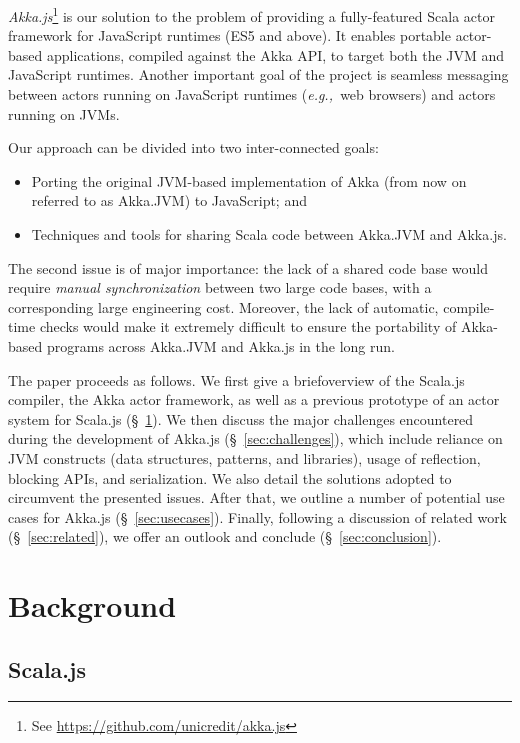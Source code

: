 \documentclass{sig-alternate}
\newcommand{\eg}{{\em e.g.,~}}
\begin{document}
{\em Akka.js}\footnote{See \url{https://github.com/unicredit/akka.js}} is our solution to the problem of providing a fully-featured Scala actor framework for JavaScript runtimes (ES5 and above). It enables portable actor-based applications, compiled against the Akka API, to target both the JVM and JavaScript runtimes. Another important goal of the project is seamless messaging between actors running on JavaScript runtimes (\eg web browsers) and actors running on JVMs.

Our approach can be divided into two inter-connected goals:
\begin{itemize}
	\item Porting the original JVM-based implementation of Akka (from now on referred to as Akka.JVM) to JavaScript; and
	\item Techniques and tools for sharing Scala code between Akka.JVM and Akka.js.
\end{itemize}
\noindent
The second issue is of major importance: the lack of a shared code base would require {\em manual synchronization} between two large code bases, with a corresponding large engineering cost. Moreover, the lack of automatic, compile-time checks would make it extremely difficult to ensure the portability of Akka-based programs across Akka.JVM and Akka.js in the long run.

The paper proceeds as follows. We first give a brief\newline overview of the Scala.js compiler, the Akka actor framework, as well as a previous prototype of an actor system for Scala.js (\S~\ref{sec:background}). We then discuss the major challenges encountered during the development of Akka.js (\S~\ref{sec:challenges}), which include reliance on JVM constructs (data structures, patterns, and libraries), usage of reflection, blocking APIs, and serialization. We also detail the solutions adopted to circumvent the presented issues. After that, we outline a number of potential use cases for Akka.js (\S~\ref{sec:usecases}). Finally, following a discussion of related work (\S~\ref{sec:related}), we offer an outlook and conclude (\S~\ref{sec:conclusion}).

\section{Background}\label{sec:background}

\subsection{Scala.js}
\end{document}
